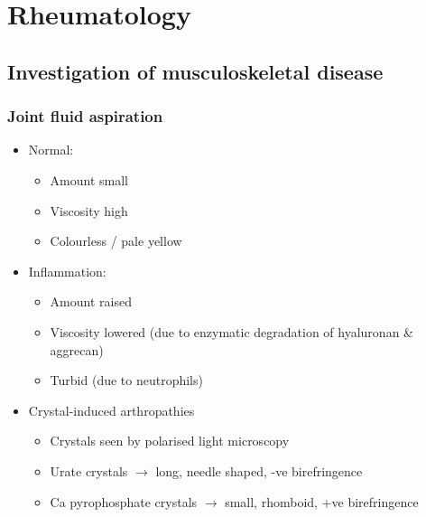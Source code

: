 \documentclass[
  12pt,
]{memoir}
\providecommand{\tightlist}{%
  \setlength{\itemsep}{0pt}\setlength{\parskip}{0pt}}
\begin{document}
\pagebreak

\hypertarget{rheumatology}{%
\chapter{Rheumatology}\label{rheumatology}}

\hypertarget{investigation-of-musculoskeletal-disease}{%
\section{Investigation of musculoskeletal
disease}\label{investigation-of-musculoskeletal-disease}}

\hypertarget{joint-fluid-aspiration}{%
\subsection{Joint fluid aspiration}\label{joint-fluid-aspiration}}

\begin{itemize}
\tightlist
\item
  Normal:

  \begin{itemize}
  \tightlist
  \item
    Amount small
  \item
    Viscosity high
  \item
    Colourless / pale yellow
  \end{itemize}
\item
  Inflammation:

  \begin{itemize}
  \tightlist
  \item
    Amount raised
  \item
    Viscosity lowered (due to enzymatic degradation of hyaluronan \&
    aggrecan)
  \item
    Turbid (due to neutrophils)
  \end{itemize}
\item
  Crystal-induced arthropathies

  \begin{itemize}
  \tightlist
  \item
    Crystals seen by polarised light microscopy
  \item
    Urate crystals \(\rightarrow\) long, needle shaped, -ve
    birefringence
  \item
    Ca pyrophosphate crystals \(\rightarrow\) small, rhomboid, +ve
    birefringence
  \end{itemize}
\end{itemize}
\end{document}
